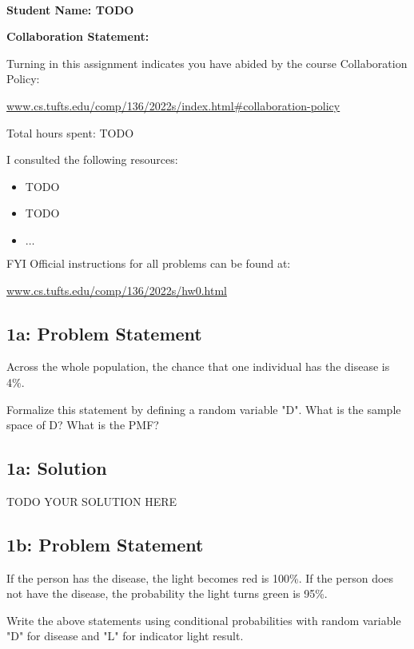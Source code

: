 \documentclass[12pt]{article}
\newcommand{\officialdirections}[1]{{\color{blue} #1}}
\begin{document}
~~\\ %

{\Large{\bf Student Name: TODO}}

{\Large{\bf Collaboration Statement:}}

Turning in this assignment indicates you have abided by the course Collaboration Policy:

\url{www.cs.tufts.edu/comp/136/2022s/index.html#collaboration-policy}

Total hours spent: TODO

I consulted the following resources:
\begin{itemize}
\item TODO
\item TODO
\item $\ldots$	
\end{itemize}

FYI Official instructions for all problems can be found at:

\url{www.cs.tufts.edu/comp/136/2022s/hw0.html}

\tableofcontents

\newpage
\officialdirections{
\subsection*{1a: Problem Statement}

Across the whole population, the chance that one individual has the disease is 4\%. 

Formalize this statement by defining a random variable "D". What is the sample space of D? What is the PMF?
}

\subsection{1a: Solution}
TODO YOUR SOLUTION HERE

\newpage

\officialdirections{
\subsection*{1b: Problem Statement}

If the person has the disease, the light becomes red is 100\%.
If the person does not have the disease, the probability the light turns green is 95\%.

Write the above statements using conditional probabilities with random variable "D" for disease and "L" for indicator light result. 
}
\end{document}
